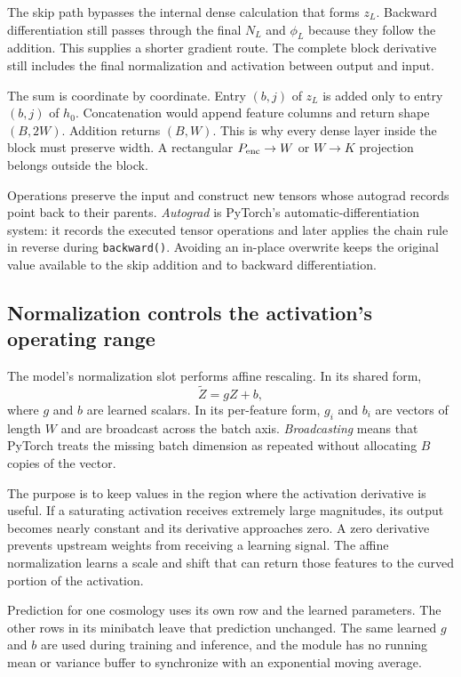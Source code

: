\documentclass[10pt,aps,prd,twocolumn,nofootinbib]{revtex4-2}
\newcommand{\code}[1]{\texttt{#1}}
\begin{document}
The skip path bypasses the internal dense calculation that forms $z_L$.
Backward differentiation still passes through the final $N_L$ and $\phi_L$
because they follow the addition.  This supplies a shorter gradient route.
The complete block derivative still includes the final normalization and
activation between output and input.

The sum is coordinate by coordinate.  Entry $(b,j)$ of $z_L$ is added only to
entry $(b,j)$ of $h_0$.  Concatenation would append feature columns and return
shape $(B,2W)$.  Addition returns $(B,W)$.  This is why every dense layer inside
the block must preserve width.  A rectangular $P_{\rm enc}\to W$ or $W\to K$
projection belongs outside the block.

Operations preserve the input and construct new tensors whose autograd records
point back to their parents.  \emph{Autograd} is PyTorch's
automatic-differentiation system: it records the executed tensor operations
and later applies the chain rule in reverse during \code{backward()}.
Avoiding an in-place overwrite keeps the original value available to the skip
addition and to backward differentiation.

\subsection{Normalization controls the activation's operating range}

The model's normalization slot performs affine rescaling.  In its shared form,
\begin{equation*}
  \widetilde Z = gZ+b,
\end{equation*}
where $g$ and $b$ are learned scalars.  In its per-feature form, $g_i$ and
$b_i$ are vectors of length $W$ and are broadcast across the batch axis.
\emph{Broadcasting} means that PyTorch treats the missing batch dimension as
repeated without allocating $B$ copies of the vector.

The purpose is to keep values in the region where the activation derivative
is useful.  If a saturating activation receives extremely large magnitudes,
its output becomes nearly constant and its derivative approaches zero.  A
zero derivative prevents upstream weights from receiving a learning signal.
The affine normalization learns a scale and shift that can return those
features to the curved portion of the activation.

Prediction for one cosmology uses its own row and the learned parameters.  The
other rows in its minibatch leave that prediction unchanged.  The same learned
$g$ and $b$ are used during training and inference,
and the module has no running mean or variance buffer to synchronize with an
exponential moving average.
\end{document}
